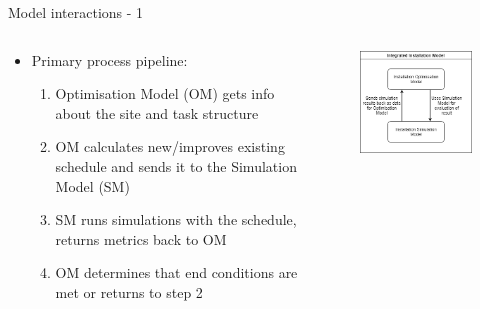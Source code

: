 \documentclass{beamer}
\begin{document}
\begin{frame}{Model interactions - 1}
\begin{columns}
	\begin{column}{0.5\textwidth}
		\begin{itemize}
			\item Primary process pipeline:
			\begin{enumerate}
				\item Optimisation Model (OM) gets info about the site and task structure
				\item OM calculates new/improves existing schedule and sends it to the Simulation Model (SM)
				\item SM runs simulations with the schedule, returns metrics back to OM
				\item OM determines that end conditions are met or returns to step 2
			\end{enumerate}
		\end{itemize}
	\end{column}

	\begin{column}{0.5\textwidth}
		\begin{figure}[t]
 			\includegraphics[width=\textwidth]{Installation}
			\centering
		\end{figure}
	\end{column}
\end{columns}
\end{frame}
\end{document}
